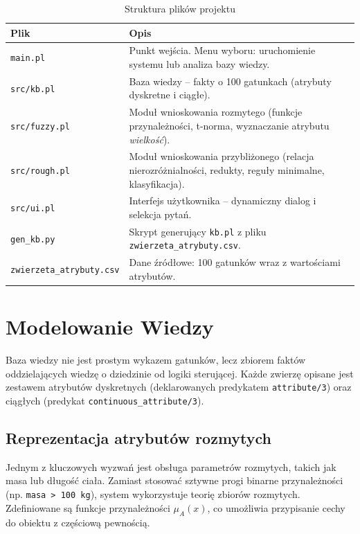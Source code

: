 \documentclass[11pt,a4paper]{article}
\newcommand{\code}[1]{\texttt{#1}}
\begin{document}
\begin{table}[h]
\centering
\caption{Struktura plików projektu}
\label{tab:files}
\begin{tabularx}{\linewidth}{l X}
\toprule
\textbf{Plik} & \textbf{Opis} \\
\midrule
\code{main.pl}              & Punkt wejścia. Menu wyboru: uruchomienie systemu lub analiza bazy wiedzy. \\
\code{src/kb.pl}            & Baza wiedzy -- fakty o 100 gatunkach (atrybuty dyskretne i ciągłe). \\
\code{src/fuzzy.pl}         & Moduł wnioskowania rozmytego (funkcje przynależności, t-norma, wyznaczanie atrybutu \textit{wielkość}). \\
\code{src/rough.pl}         & Moduł wnioskowania przybliżonego (relacja nierozróżnialności, redukty, reguły minimalne, klasyfikacja). \\
\code{src/ui.pl}            & Interfejs użytkownika -- dynamiczny dialog i selekcja pytań. \\
\code{gen\_kb.py}           & Skrypt generujący \code{kb.pl} z pliku \code{zwierzeta\_atrybuty.csv}. \\
\code{zwierzeta\_atrybuty.csv} & Dane źródłowe: 100 gatunków wraz z wartościami atrybutów. \\
\bottomrule
\end{tabularx}
\end{table}

\section{Modelowanie Wiedzy}
Baza wiedzy nie jest prostym wykazem gatunków, lecz zbiorem faktów oddzielających
wiedzę o dziedzinie od logiki sterującej. Każde zwierzę opisane jest zestawem
atrybutów dyskretnych (deklarowanych predykatem \code{attribute/3}) oraz ciągłych
(predykat \code{continuous\_attribute/3}).

\subsection{Reprezentacja atrybutów rozmytych}
Jednym z kluczowych wyzwań jest obsługa parametrów rozmytych, takich jak masa
lub długość ciała. Zamiast stosować sztywne progi binarne przynależności (np.
\code{masa > 100 kg}), system wykorzystuje teorię zbiorów rozmytych. Zdefiniowane
są funkcje przynależności $\mu_A(x)$, co umożliwia przypisanie cechy do obiektu
z częściową pewnością.
\end{document}
